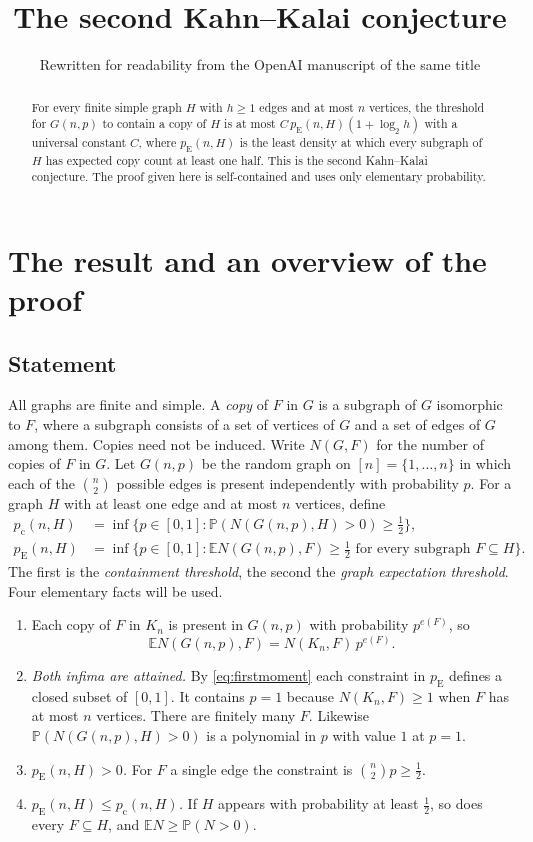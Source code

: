 \documentclass[11pt]{article}
\title{The second Kahn--Kalai conjecture}
\author{Rewritten for readability from the OpenAI manuscript of the same title}
\date{}
\numberwithin{equation}{section}
\newcommand{\PP}{\mathbb P}
\newcommand{\EE}{\mathbb E}
\newcommand{\pc}{p_{\mathrm c}}
\newcommand{\pE}{p_{\mathrm E}}
\begin{document}
\maketitle
\begin{abstract}
For every finite simple graph $H$ with $h\ge1$ edges and at most $n$
vertices, the threshold for $G(n,p)$ to contain a copy of $H$ is at most
$C\,\pE(n,H)(1+\log_2 h)$ with a universal constant $C$, where
$\pE(n,H)$ is the least density at which every subgraph of $H$ has
expected copy count at least one half. This is the second Kahn--Kalai
conjecture. The proof given here is self-contained and uses only
elementary probability.
\end{abstract}

\section{The result and an overview of the proof}\label{sec:introduction}

\subsection{Statement}

All graphs are finite and simple. A \emph{copy} of $F$ in $G$ is a
subgraph of $G$ isomorphic to $F$, where a subgraph consists of a set of
vertices of $G$ and a set of edges of $G$ among them. Copies need not be
induced. Write $N(G,F)$ for the number of copies of $F$ in $G$. Let
$G(n,p)$ be the random graph on $[n]=\{1,\ldots,n\}$ in which each of
the $\binom n2$ possible edges is present independently with
probability $p$. For a graph $H$ with at least one edge and at most $n$
vertices, define
\begin{align*}
 \pc(n,H)
 &=\inf\{p\in[0,1]:\PP(N(G(n,p),H)>0)\ge\tfrac12\},\\
 \pE(n,H)
 &=\inf\{p\in[0,1]:\EE N(G(n,p),F)\ge\tfrac12
                 \text{ for every subgraph }F\subseteq H\}.
\end{align*}
The first is the \emph{containment threshold}, the second the
\emph{graph expectation threshold}. Four elementary facts will be used.
\begin{enumerate}[label=(\alph*),leftmargin=2.2em,itemsep=2pt]
 \item Each copy of $F$ in $K_n$ is present in $G(n,p)$ with
 probability $p^{e(F)}$, so
 \begin{equation}\label{eq:firstmoment}
  \EE N(G(n,p),F)=N(K_n,F)\,p^{e(F)}.
 \end{equation}
 \item \emph{Both infima are attained.} By \eqref{eq:firstmoment} each
 constraint in $\pE$ defines a closed subset of $[0,1]$. It contains
 $p=1$ because $N(K_n,F)\ge1$ when $F$ has at most $n$ vertices. There
 are finitely many $F$. Likewise $\PP(N(G(n,p),H)>0)$ is a polynomial
 in $p$ with value $1$ at $p=1$.
 \item \emph{$\pE(n,H)>0$.} For $F$ a single edge the constraint is
 $\binom n2 p\ge\frac12$.
 \item \emph{$\pE(n,H)\le\pc(n,H)$.} If $H$ appears with probability
 at least $\frac12$, so does every $F\subseteq H$, and
 $\EE N\ge\PP(N>0)$.
\end{enumerate}
\end{document}
